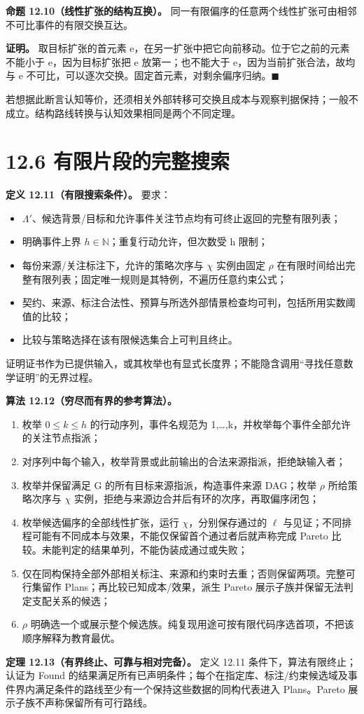 \documentclass[UTF8,a4paper,zihao=-4,fontset=windows,openany]{ctexbook}
\begin{document}
\textbf{命题 12.10（线性扩张的结构互换）。} 同一有限偏序的任意两个线性扩张可由相邻不可比事件的有限交换互达。

\textbf{证明。} 取目标扩张的首元素 e，在另一扩张中把它向前移动。位于它之前的元素不能小于 e，因为目标扩张把 e 放第一；也不能大于 e，因为当前扩张合法，故均与 e 不可比，可以逐次交换。固定首元素，对剩余偏序归纳。\(\blacksquare\)

若想据此断言认知等价，还须相关外部转移可交换且成本与观察判据保持；一般不成立。结构路线转换与认知效果相同是两个不同定理。

\section{12.6 有限片段的完整搜索}
\textbf{定义 12.11（有限搜索条件）。} 要求：

\begin{itemize}
\item \(\Lambda'\)、候选背景/目标和允许事件关注节点均有可终止返回的完整有限列表；
\item 明确事件上界 \(h\in\mathbb{N}\)；重复行动允许，但次数受 h 限制；
\item 每份来源/关注标注下，允许的策略次序与 \(\chi\) 实例由固定 \(\rho\) 在有限时间给出完整有限列表；固定唯一规则是其特例，不遍历任意约束公式；
\item 契约、来源、标注合法性、预算与所选外部情景检查均可判，包括所用实数阈值的比较；
\item 比较与策略选择在该有限候选集合上可判且终止。
\end{itemize}
证明证书作为已提供输入，或其枚举也有显式长度界；不能隐含调用“寻找任意数学证明”的无界过程。

\textbf{算法 12.12（穷尽而有界的参考算法）。}

\begin{enumerate}
\item 枚举 \(0\le k\le h\) 的行动序列，事件名规范为 1,…,k，并枚举每个事件全部允许的关注节点指派；
\item 对序列中每个输入，枚举背景或此前输出的合法来源指派，拒绝缺输入者；
\item 枚举并保留满足 G 的所有目标来源指派，构造事件来源 DAG；枚举 \(\rho\) 所给策略次序与 \(\chi\) 实例，拒绝与来源边合并后有环的次序，再取偏序闭包；
\item 枚举候选偏序的全部线性扩张，运行 \(\chi\)，分别保存通过的 \(\ell\) 与见证；不同排程可能有不同成本与效果，不能仅保留首个通过者后就声称完成 Pareto 比较。未能判定的结果单列，不能伪装成通过或失败；
\item 仅在同构保持全部外部相关标注、来源和约束时去重；否则保留两项。完整可行集留作 Plans；再比较已知成本/效果，派生 Pareto 展示子族并保留无法判定支配关系的候选；
\item \(\rho\) 明确选一个或展示整个候选族。纯复现用途可按有限代码序选首项，不把该顺序解释为教育最优。
\end{enumerate}
\textbf{定理 12.13（有界终止、可靠与相对完备）。} 定义 12.11 条件下，算法有限终止；认证为 Found 的结果满足所有已声明条件；每个在指定库、标注/约束候选域及事件界内满足条件的路线至少有一个保持这些数据的同构代表进入 Plans。Pareto 展示子族不声称保留所有可行路线。
\end{document}
